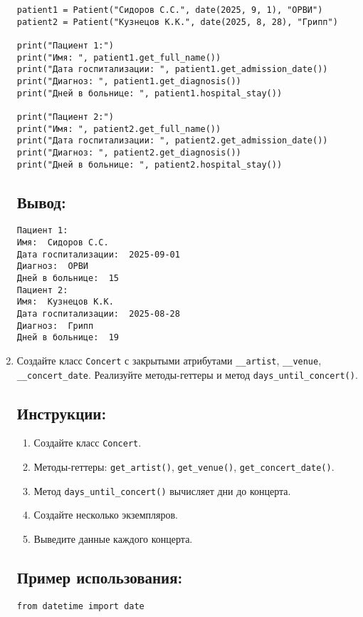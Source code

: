 \begin{enumerate}
\begin{lstlisting}[caption=Пример кода]
patient1 = Patient("Сидоров С.С.", date(2025, 9, 1), "ОРВИ")
patient2 = Patient("Кузнецов К.К.", date(2025, 8, 28), "Грипп")

print("Пациент 1:")
print("Имя: ", patient1.get_full_name())
print("Дата госпитализации: ", patient1.get_admission_date())
print("Диагноз: ", patient1.get_diagnosis())
print("Дней в больнице: ", patient1.hospital_stay())

print("Пациент 2:")
print("Имя: ", patient2.get_full_name())
print("Дата госпитализации: ", patient2.get_admission_date())
print("Диагноз: ", patient2.get_diagnosis())
print("Дней в больнице: ", patient2.hospital_stay())
\end{lstlisting}

\subsection*{Вывод:}
\begin{lstlisting}[caption=Ожидаемый вывод]
Пациент 1:
Имя:  Сидоров С.С.
Дата госпитализации:  2025-09-01
Диагноз:  ОРВИ
Дней в больнице:  15
Пациент 2:
Имя:  Кузнецов К.К.
Дата госпитализации:  2025-08-28
Диагноз:  Грипп
Дней в больнице:  19
\end{lstlisting}

\item
Создайте класс \texttt{Concert} с закрытыми атрибутами \texttt{\_\_artist}, \texttt{\_\_venue}, \texttt{\_\_concert\_date}. Реализуйте методы-геттеры и метод \texttt{days\_until\_concert()}.

\subsection*{Инструкции:}
\begin{enumerate}
    \item Создайте класс \texttt{Concert}.
    \item Методы-геттеры: \texttt{get\_artist()}, \texttt{get\_venue()}, \texttt{get\_concert\_date()}.
    \item Метод \texttt{days\_until\_concert()} вычисляет дни до концерта.
    \item Создайте несколько экземпляров.
    \item Выведите данные каждого концерта.
\end{enumerate}

\subsection*{Пример использования:}
\begin{lstlisting}[caption=Пример кода]
from datetime import date


\end{lstlisting}
\end{enumerate}
